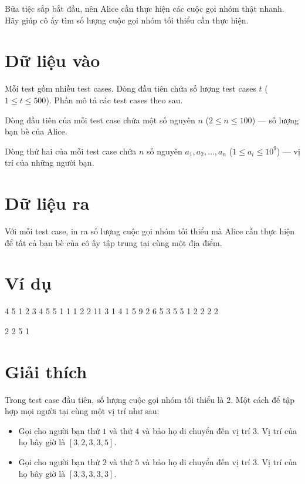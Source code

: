 \documentclass[12pt,a4paper]{article}
\begin{document}
Bữa tiệc sắp bắt đầu, nên Alice cần thực hiện các cuộc gọi nhóm thật nhanh. Hãy giúp cô ấy tìm số lượng cuộc gọi nhóm tối thiểu cần thực hiện.

\section*{Dữ liệu vào}
Mỗi test gồm nhiều test cases. Dòng đầu tiên chứa số lượng test cases $t$ ($1 \le t \le 500$). Phần mô tả các test cases theo sau.

Dòng đầu tiên của mỗi test case chứa một số nguyên $n$ ($2 \le n \le 100$) — số lượng bạn bè của Alice.

Dòng thứ hai của mỗi test case chứa $n$ số nguyên $a_1, a_2, \ldots, a_n$ ($1 \le a_i \le 10^9$) — vị trí của những người bạn.

\section*{Dữ liệu ra}
Với mỗi test case, in ra số lượng cuộc gọi nhóm tối thiểu mà Alice cần thực hiện để tất cả bạn bè của cô ấy tập trung tại cùng một địa điểm.

\section*{Ví dụ}


\begin{inputbox}4
5
1 2 3 4 5
5
1 1 1 2 2
11
3 1 4 1 5 9 2 6 5 3 5
5
1 2 2 2 2
\end{inputbox}
\begin{outputbox}2
2
5
1
\end{outputbox}



\section*{Giải thích}
Trong test case đầu tiên, số lượng cuộc gọi nhóm tối thiểu là $2$. Một cách để tập hợp mọi người tại cùng một vị trí như sau:
\begin{itemize}
    \item Gọi cho người bạn thứ $1$ và thứ $4$ và bảo họ di chuyển đến vị trí $3$. Vị trí của họ bây giờ là $[3, 2, 3, 3, 5]$.
    \item Gọi cho người bạn thứ $2$ và thứ $5$ và bảo họ di chuyển đến vị trí $3$. Vị trí của họ bây giờ là $[3, 3, 3, 3, 3]$.
\end{itemize}
\end{document}

